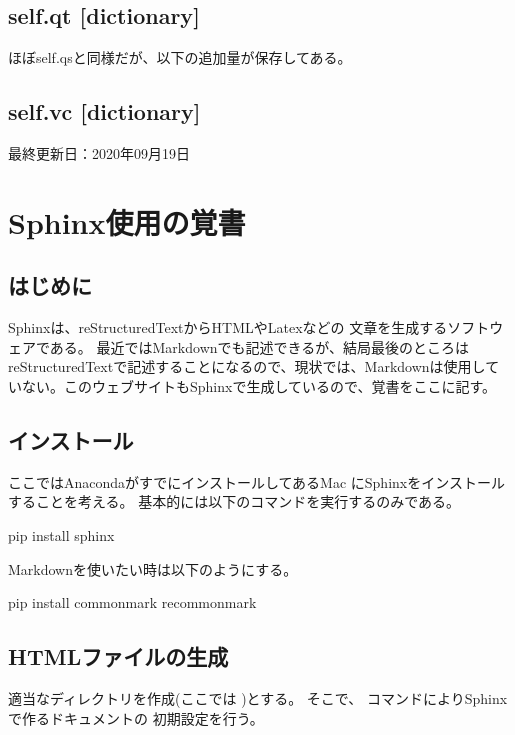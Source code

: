 \documentclass[letterpaper,10pt,dvipdfmx,report]{sphinxmanual}
\begin{document}
\section{self.qt {[}dictionary{]}}
\label{\detokenize{notation:self-qt-dictionary}}
ほぼself.qsと同様だが、以下の追加量が保存してある。


\section{self.vc {[}dictionary{]}}
\label{\detokenize{notation:self-vc-dictionary}}
最終更新日：2020年09月19日


\chapter{Sphinx使用の覚書}
\label{\detokenize{sphinx:sphinx}}\label{\detokenize{sphinx::doc}}

\section{はじめに}
\label{\detokenize{sphinx:id1}}
Sphinxは、reStructuredTextからHTMLやLatexなどの
文章を生成するソフトウェアである。
最近ではMarkdownでも記述できるが、結局最後のところはreStructuredTextで記述することになるので、現状では、Markdownは使用していない。このウェブサイトもSphinxで生成しているので、覚書をここに記す。


\section{インストール}
\label{\detokenize{sphinx:id3}}
ここではAnacondaがすでにインストールしてあるMac
にSphinxをインストールすることを考える。
基本的には以下のコマンドを実行するのみである。

\begin{sphinxVerbatim}[commandchars=\\\{\}]
pip install sphinx
\end{sphinxVerbatim}

Markdownを使いたい時は以下のようにする。

\begin{sphinxVerbatim}[commandchars=\\\{\}]
pip install commonmark recommonmark
\end{sphinxVerbatim}


\section{HTMLファイルの生成}
\label{\detokenize{sphinx:html}}
適当なディレクトリを作成(ここでは  )とする。
そこで、  コマンドによりSphinxで作るドキュメントの
初期設定を行う。
\end{document}
